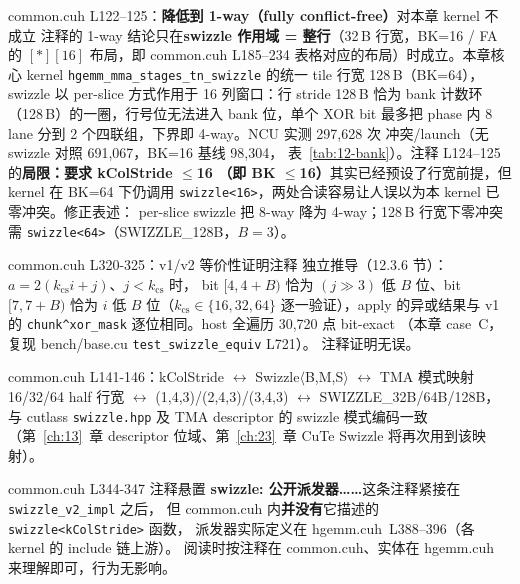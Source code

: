 \begin{kaogu}[F3 + NCU 实证]{common.cuh L122--125：\textbf{降低到 1-way（fully conflict-free）}对本章 kernel 不成立}
  注释的 1-way 结论只在\textbf{swizzle 作用域 = 整行}（32\,B 行宽，BK=16 / FA 的
  $[\ast][16]$ 布局，即 common.cuh L185--234 表格对应的布局）时成立。本章核心
  kernel \texttt{hgemm\_\allowbreak{}mma\_\allowbreak{}stages\_\allowbreak{}tn\_\allowbreak{}swizzle} 的统一 tile 行宽 128\,B（BK=64），
  swizzle 以 per-slice 方式作用于 16 列窗口：行 stride 128\,B 恰为 bank 计数环
  （128\,B）的一圈，行号位无法进入 bank 位，单个 XOR bit 最多把 phase 内
  8 lane 分到 2 个四联组，下界即 4-way。NCU 实测 297{,}628 次
  冲突/launch（无 swizzle 对照 691{,}067，BK=16 基线 98{,}304，
  表~\ref{tab:12-bank}）。注释 L124--125 的\textbf{局限：要求 kColStride $\le$16
  （即 BK $\le$16）}其实已经预设了行宽前提，但 kernel 在 BK=64 下仍调用
  \texttt{swizzle<16>}，两处合读容易让人误以为本 kernel 已零冲突。修正表述：
  per-slice swizzle 把 8-way 降为 4-way；128\,B 行宽下零冲突需
  \texttt{swizzle<64>}（SWIZZLE\_128B，$B{=}3$）。
\end{kaogu}

\begin{kaogu}[F3 核校通过]{common.cuh L320-325：v1/v2 等价性证明注释}
  独立推导（12.3.6 节）：$a=2(k_{\mathrm{cs}}i+j)$、$j<k_{\mathrm{cs}}$ 时，
  bit $[4,4{+}B)$ 恰为 $(j{\gg}3)$ 低 $B$ 位、bit $[7,7{+}B)$ 恰为 $i$ 低 $B$
  位（$k_{\mathrm{cs}}\in\{16,32,64\}$ 逐一验证），apply 的异或结果与 v1 的
  \texttt{chunk\^{}xor\_\allowbreak{}mask} 逐位相同。host 全遍历 30{,}720 点 bit-exact
  （本章 case~C，复现 bench/base.cu \texttt{test\_\allowbreak{}swizzle\_\allowbreak{}equiv} L721）。
  注释证明无误。
\end{kaogu}

\begin{kaogu}[F1 核校通过]{common.cuh L141-146：kColStride $\leftrightarrow$ Swizzle$\langle$B,M,S$\rangle$ $\leftrightarrow$ TMA 模式映射}
  16/32/64 half 行宽 $\leftrightarrow$ (1,4,3)/(2,4,3)/(3,4,3) $\leftrightarrow$
  SWIZZLE\_32B/64B/128B，与 cutlass \texttt{swizzle.hpp} 及 TMA descriptor 的
  swizzle 模式编码一致（第~\ref{ch:13}~章 descriptor 位域、第~\ref{ch:23}~章
  CuTe Swizzle 将再次用到该映射）。
\end{kaogu}

\begin{kaogu}[位置考据]{common.cuh L344-347 注释悬置}
  \textbf{swizzle: 公开派发器……}这条注释紧接在 \texttt{swizzle\_\allowbreak{}v2\_\allowbreak{}impl} 之后，
  但 common.cuh 内\textbf{并没有}它描述的 \texttt{swizzle\allowbreak{}<k\allowbreak{}Col\allowbreak{}Stride>} 函数，
  派发器实际定义在 hgemm.cuh~L388--396（各 kernel 的 include 链上游）。
  阅读时按注释在 common.cuh、实体在 hgemm.cuh 来理解即可，行为无影响。
\end{kaogu}

